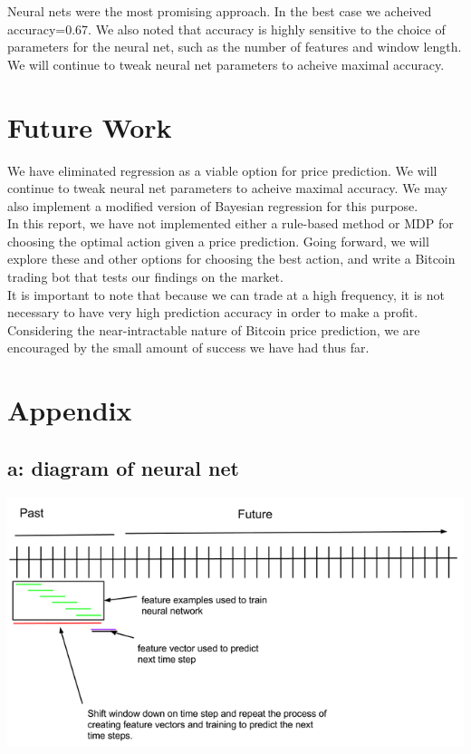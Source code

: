 \documentclass[10pt]{article}
\begin{document}
 	Neural nets were the most promising approach. In the best case we acheived accuracy=0.67. We also noted that accuracy is highly sensitive to the choice of parameters for the neural net, such as the number of features and window length. We will continue to tweak neural net parameters to acheive maximal accuracy. 
 	\section*{Future Work}
 	
We have eliminated regression as a viable option for price prediction. We will continue to tweak neural net parameters to acheive maximal accuracy. We may also implement a modified version of Bayesian regression for this purpose. \\

In this report, we have not implemented either a rule-based method or MDP for choosing the optimal action given a price prediction. Going forward, we will explore these and other options for choosing the best action, and write a Bitcoin trading bot that tests our findings on the market. \\

 	It is important to note that because we can trade at a high frequency, it is not necessary to have very high prediction accuracy in order to make a profit. Considering the near-intractable nature of Bitcoin price prediction, we are encouraged by the small amount of success we have had thus far.  
 	 
 
 \section*{Appendix}
 \subsection*{a: diagram of neural net}
 \includegraphics[scale=0.7]{diagram.png}
\end{document}
